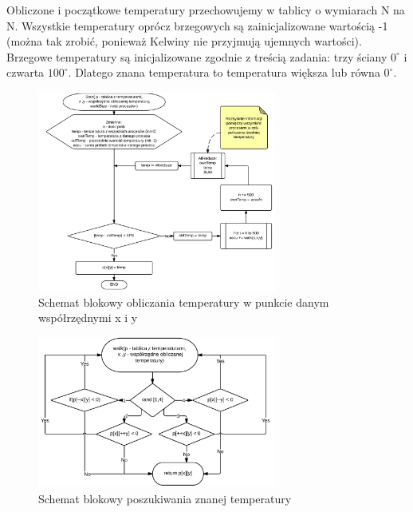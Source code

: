 \documentclass[11pt,a4paper]{article}
\begin{document}
Obliczone i początkowe temperatury przechowujemy w tablicy o wymiarach N na N. Wszystkie temperatury oprócz brzegowych są zainicjalizowane wartością -1 (można tak zrobić, ponieważ Kelwiny nie przyjmują ujemnych wartości). Brzegowe temperatury są inicjalizowane zgodnie z treścią zadania: trzy ściany $0^{\circ}$ i czwarta $100^{\circ}$. Dlatego znana temperatura to temperatura większa lub równa $0^{\circ}$.

\begin{figure}[H]
\begin{center}
\includegraphics[width=0.7\textwidth]{schemat1.png}
\caption{Schemat blokowy obliczania temperatury w punkcie danym współrzędnymi x i y}
\end{center}
\end{figure}

\begin{figure}[H]
\begin{center}
\includegraphics[width=0.7\textwidth]{schemat2.png}
\caption{Schemat blokowy poszukiwania znanej temperatury}
\end{center}
\end{figure}
\end{document}
